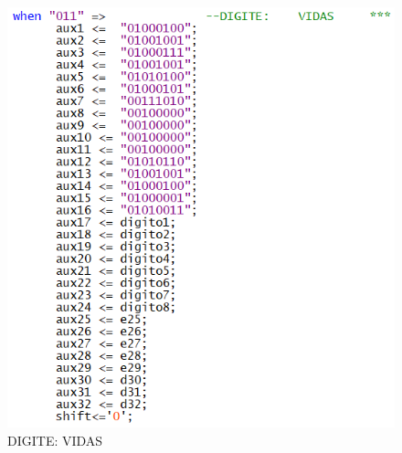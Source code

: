 \documentclass[14pt, oneside]{book}
\theoremstyle{definition}
\begin{document}
                \begin{figure}[H]
                    \centering
                    \includegraphics[scale=1]{lcdexample4.png}
                    \caption{DIGITE: VIDAS}
                    \label{lcdexample4}
                \end{figure}
                
\end{document}
